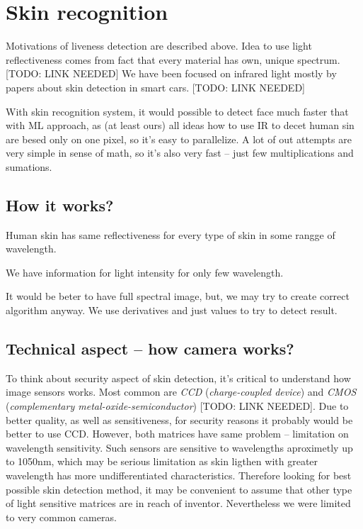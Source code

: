 \section{Skin recognition}
    Motivations of liveness detection are described above.
    Idea to use light reflectiveness comes from fact that
    every material has own, unique spectrum. [TODO: LINK NEEDED]
    We have been focused on infrared light mostly by papers about
    skin detection in smart cars. [TODO: LINK NEEDED]

    With skin recognition system, it would possible to
    detect face much faster that with ML approach,
    as (at least ours) all ideas how to use IR
    to decet human sin are besed only on one pixel,
    so it's easy to parallelize.
    A lot of out attempts are very simple in sense of math,
    so it's also very fast -- just few multiplications and sumations.

    \subsection{How it works?}
        Human skin has same reflectiveness for every type of skin
        in some rangge of wavelength.

        We have information for light intensity for only few wavelength.

        It would be beter to have full spectral image,
        but, we may try to create correct algorithm anyway.
        We use derivatives and just values to try to detect result.

    \subsection{Technical aspect -- how camera works?}
        To think about security aspect of skin detection,
        it's critical to understand how image sensors works.
        Most common are \textit{CCD} (\textit{charge-coupled device})
        and \textit{CMOS} (\textit{complementary metal-oxide-semiconductor})
        [TODO: LINK NEEDED]. %
        Due to better quality, as well as sensitiveness, for security reasons
        it probably would be better to use CCD.
        However, both matrices have same problem -- limitation on wavelength sensitivity.
        Such sensors are sensitive to wavelengths aproximetly up to 1050nm,
        which may be serious limitation as skin ligthen with greater wavelength has
        more undifferentiated characteristics.
        Therefore looking for best possible skin detection method,
        it may be convenient to assume that other type of light sensitive matrices
        are in reach of inventor.
        Nevertheless we were limited to very common cameras.

